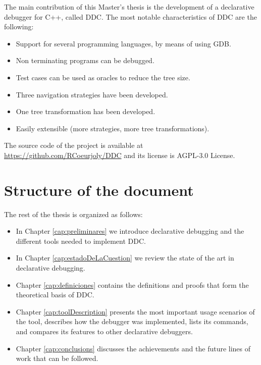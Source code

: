 The main contribution of this Master's thesis is the development of a declarative debugger for C++, called DDC.
%
The most notable characteristics of DDC are the following:
\begin{itemize}
\item Support for several programming languages, by means of using GDB.
\item Non terminating programs can be debugged.
\item Test cases can be used as oracles to reduce the tree size.
\item Three navigation strategies have been developed.
\item One tree transformation has been developed.
\item Easily extensible (more strategies, more tree transformations).
\end{itemize}

The source code of the project is available at \url{https://github.com/RCoeurjoly/DDC} 
and its license is AGPL-3.0 License.

\section{Structure of the document}
The rest of the thesis is organized as follows:
\begin{itemize}
    \item In Chapter \ref{cap:preliminares} we introduce declarative debugging and the different tools needed to implement DDC.
    \item  In Chapter \ref{cap:estadoDeLaCuestion} we review the state of the art in declarative debugging. 
    \item Chapter \ref{cap:definiciones} contains the definitions and proofs that form the theoretical basis of DDC. 
    \item Chapter \ref{cap:toolDescription} presents the most important usage scenarios of the tool, describes how the debugger was implemented, lists its commands, and compares its features to other declarative debuggers. 
    \item Chapter \ref{cap:conclusions} discusses the achievements and the future lines of work that can be followed.
\end{itemize}
